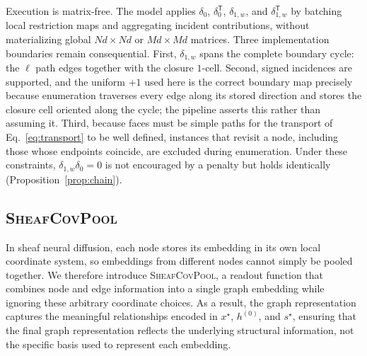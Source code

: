 \documentclass[sigconf,anonymous,review]{acmart}
\newcommand{\sheafcovpool}{\textsc{SheafCovPool}}
\newcommand{\transpose}{\mathsf{T}}
\begin{document}
Execution is matrix-free.  The model applies \(\delta_0\), \(\delta_0^{\transpose}\),
\(\delta_{1,w}\), and \(\delta_{1,w}^{\transpose}\) by batching local restriction maps and
aggregating incident contributions, without materializing global \(Nd\times Nd\) or
\(Md\times Md\) matrices.  Three implementation boundaries remain consequential.  First,
\(\delta_{1,w}\) spans the complete boundary cycle: the \(\ell\) path edges together with the
closure \(1\)-cell.  Second, signed incidences are supported, and the uniform \(+1\) used here is
the correct boundary map precisely because enumeration traverses every edge along its stored
direction and stores the closure cell oriented along the cycle; the pipeline asserts this rather
than assuming it.  Third, because faces must be simple paths for the transport of
Eq.~\eqref{eq:transport} to be well defined, instances that revisit a node, including those whose
endpoints coincide, are excluded during enumeration.  Under these constraints,
\(\delta_{1,w}\delta_0=0\) is not encouraged by a penalty but holds identically
(Proposition~\ref{prop:chain}).



\subsection{\sheafcovpool{}}

In sheaf neural diffusion, each node stores its embedding in its own local coordinate system, so embeddings from different nodes cannot simply be pooled together. We therefore introduce \sheafcovpool{}, a readout function that combines node and edge information into a single graph embedding while ignoring these arbitrary coordinate choices. As a result, the graph representation captures the meaningful relationships encoded in \(x^\star\), \(h^{(0)}\), and \(s^\star\), ensuring that the final graph representation reflects the underlying structural information, not the specific basis used to represent each embedding.
\end{document}
